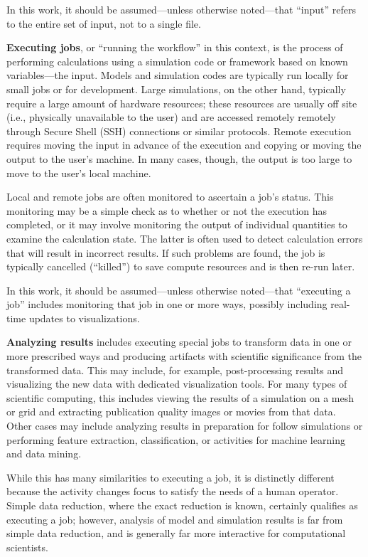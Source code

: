 In this work, it should be assumed---unless otherwise noted---that
``input'' refers to the entire set of input, not to a single file.

\textbf{Executing jobs}, or ``running the workflow'' in this context, is
the process of performing calculations using a simulation code or
framework based on known variables---the input. Models and simulation
codes are typically run locally for small jobs or for development. Large
simulations, on the other hand, typically require a large amount of
hardware resources; these resources are usually off site (i.e.,
physically unavailable to the user) and are accessed remotely remotely
through Secure Shell (SSH) connections or similar protocols. Remote
execution requires moving the input in advance of the execution and
copying or moving the output to the user's machine. In many cases,
though, the output is too large to move to the user's local machine.

Local and remote jobs are often monitored to ascertain a job's status.
This monitoring may be a simple check as to whether or not the execution
has completed, or it may involve monitoring the output of individual
quantities to examine the calculation state. The latter is often used to
detect calculation errors that will result in incorrect results. If such
problems are found, the job is typically cancelled (``killed'') to save
compute resources and is then re-run later.

In this work, it should be assumed---unless otherwise noted---that
``executing a job'' includes monitoring that job in one or more ways,
possibly including real-time updates to visualizations.

\textbf{Analyzing results} includes executing special jobs to transform
data in one or more prescribed ways and producing artifacts with
scientific significance from the transformed data. This may include, for
example, post-processing results and visualizing the new data with
dedicated visualization tools. For many types of scientific computing,
this includes viewing the results of a simulation on a mesh or grid and
extracting publication quality images or movies from that data. Other
cases may include analyzing results in preparation for follow
simulations or performing feature extraction, classification, or
activities for machine learning and data mining.

While this has many similarities to executing a job, it is distinctly
different because the activity changes focus to satisfy the needs of a
human operator. Simple data reduction, where the exact reduction is
known, certainly qualifies as executing a job; however, analysis of
model and simulation results is far from simple data reduction, and is
generally far more interactive for computational scientists.

